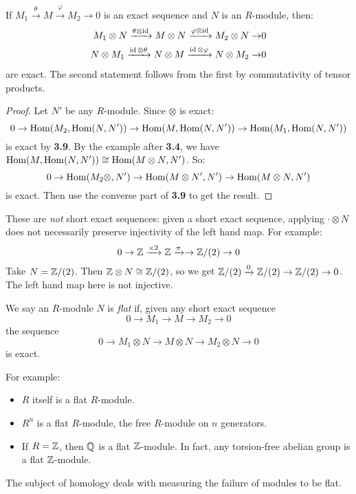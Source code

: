 \documentclass[10pt,a4paper]{article}
\begin{document}
\begin{lemma}
  If $M_1 \xrightarrow{\theta} M \xrightarrow{\varphi} M_2 \to 0$ is an exact sequence and $N$ is an $R$-module, then:
  \begin{align*}
    M_1 \otimes N \xrightarrow{\theta \otimes \operatorname{id}} M\otimes N \xrightarrow{\varphi \otimes \operatorname{id}} M_2 \otimes N \to &0\\
    N \otimes M_1 \xrightarrow{\operatorname{id} \otimes \theta} N\otimes M \xrightarrow{\operatorname{id} \otimes \varphi} N \otimes M_2 \to &0
  \end{align*}
  are exact. The second statement follows from the first by commutativity of tensor products.
\end{lemma}
\begin{proof}
  Let $N'$ be any $R$-module. Since $\otimes$ is exact:
  \[ 0 \to \operatorname{Hom}(M_2, \operatorname{Hom}(N, N')) \to \operatorname{Hom}(M, \operatorname{Hom}(N, N')) \to \operatorname{Hom}(M_1, \operatorname{Hom}(N, N'))\]
  is exact by \textbf{3.9}. By the example after \textbf{3.4}, we have $\operatorname{Hom}(M, \operatorname{Hom}(N, N')) \cong \operatorname{Hom}(M \otimes N, N')$. So:
  \[ 0 \to \operatorname{Hom}(M_2 \otimes, N') \to \operatorname{Hom}(M \otimes N', N') \to \operatorname{Hom}(M \otimes N, N')\]
  is exact. Then use the converse part of \textbf{3.9} to get the result.
\end{proof}
These are \textit{not} short exact sequences: given a short exact sequence, applying $\cdot \otimes N$ does not necessarily preserve injectivity of the left hand map. For example:
\[ 0 \to \mathbb{Z} \xrightarrow{\times 2} \mathbb{Z} \xrightarrow{\pi} \to \mathbb{Z}/(2) \to 0\]
Take $N = \mathbb{Z}/(2)$. Then $\mathbb{Z} \otimes N \cong \mathbb{Z}/(2)$, so we get $\mathbb{Z}/(2) \xrightarrow{0} \mathbb{Z}/(2) \to \mathbb{Z}/(2) \to 0$. The left hand map here is not injective.

\begin{definition}
  We say an $R$-module $N$ is \emph{flat} if, given any short exact sequence
  \[0 \to M_1 \to M \to M_2 \to 0\]
  the sequence
  \[0 \to M_1 \otimes N \to M \otimes N \to M_2 \otimes N \to 0\]
  is exact.
\end{definition}
For example:
\begin{itemize}
  \item $R$ itself is a flat $R$-module.
  \item $R^n$ is a flat $R$-module, the free $R$-module on $n$ generators.
  \item If $R = \mathbb{Z}$, then $\mathbb{Q}$ is a flat $\mathbb{Z}$-module. In fact, any torsion-free abelian group is a flat $\mathbb{Z}$-module.
\end{itemize}
The subject of homology deals with measuring the failure of modules to be flat.
\end{document}
